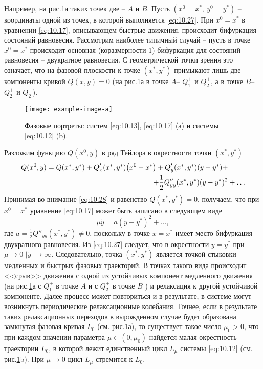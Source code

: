 Например, на рис.\ref{fig:10.6}а таких точек две -- $A$ и $B$. Пусть
$(x^0 = x^*, ~ y^0 = y^*)$ -- координаты одной из точек, в которой выполняется
\eqref{eq:10.27}. При $x^0 = x^*$ в уравнении \eqref{eq:10.17}, описывающем быстрые движения,
происходит бифуркация состояний равновесия. Рассмотрим наиболее типичный случай --
пусть в точке $x^0 = x^*$ происходит основная (коразмерности 1) бифуркация для
состояний равновесия -- двукратное равновесия. С геометрической точки зрения
это означает, что на фазовой плоскости к точке $(x^*, y^*)$ примыкают лишь
две компоненты кривой $Q(x,y) = 0$ (на рис.\ref{fig:10.6}а в точке $A$-- $Q_{1}^+$ и
$Q_{2}^+$, а в точке $B$-- $Q_{2}^+$ и $Q_{2}^-$).
\begin{figure}[h]
        \centering
        \texttt{[image: example-image-a]}
        \caption{Фазовые портреты: систем \eqref{eq:10.13}, \eqref{eq:10.17} (а) и 
        системы \eqref{eq:10.12} (b).}
        \label{fig:10.6}
\end{figure}
Разложим функцию $Q(x^0,y)$ в ряд Тейлора в окрестности точки $(x^*,y^*)$ 
\begin{equation}
        \label{eq:10.28}
\begin{aligned}
        Q(x^0,y) = Q(x^*,y^*) + Q'_{x}(x^*,y^*)\qty(x^0 - x^*) + Q'_y(x^*,y^*)(y-y^*)+& \\
        + \frac{1}{2} Q''_{yy}(x^*,y^*)(y-y^*)^2 &+ \dots                                                                 
\end{aligned}
\end{equation}
Принимая во внимание \eqref{eq:10.28} и равенство $Q(x^*,y^*)=0$, получаем, что при
$x^0 =x^*$ уравнение \eqref{eq:10.17} может быть записано в следующем виде
\begin{equation}
        \label{eq:10.29}
        \mu \dot y = a(y-y^*)^2 + \dots,
\end{equation}
где $a= \frac{1}{2} Q''_{yy}(x^*,y^*)\neq 0$, поскольку в точке $x=x^*$ имеет место 
бифуркация двукратного равновесия. Из \eqref{eq:10.27} следует, что в окрестности $y=y^*$ 
при $\mu \to 0$ $|\dot y| \to \infty$. Следовательно, точка $(x^*,y^*)$ является точкой стыковки медленных и быстрых фазовых траекторий.
В точках такого вида происходит <<срыв>> движения с одной из устойчивых компонент 
медленного движения (на рис.\ref{fig:10.6}а с $Q_{1}^+$ в точке $A$ и с $Q_{2}^+$ в точке $B$ )
и релаксация к другой устойчивой компоненте. Далее процесс может повториться и в результате, в 
системе могут возникнуть периодические релаксационные колебания. Точнее, если
в результате таких релаксационных переходов в вырожденном случае будет 
образована замкнутая фазовая кривая $L_{0}$ (см. рис.\ref{fig:10.6}а), то
существует такое число $\mu_{0}>0$, что при каждом значении параметра $\mu \in (0,\mu_{0})$ 
найдется малая окрестность траектории $L_{0}$, в которой лежит единственный цикл
$L_{\mu}$ системы \eqref{eq:10.12} (см. рис.\ref{fig:10.6}b). 
При $\mu \to 0 $ цикл $L_{\mu}$ стремится к $L_{0}$.


